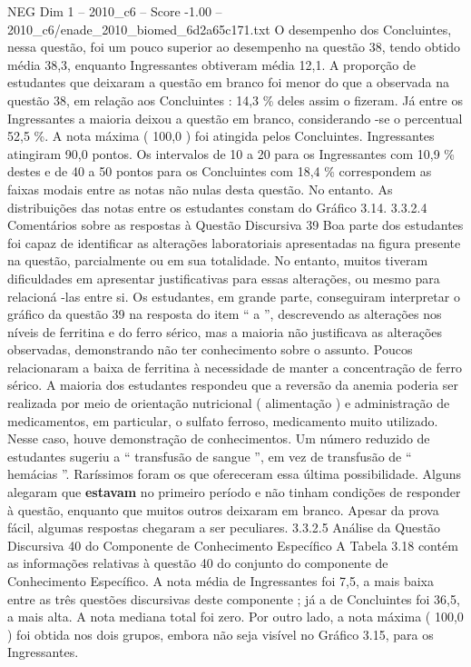 \begin{textsample}{NEG Dim 1 – 2010\_c6 – Score -1.00 – 2010\_c6/enade\_2010\_biomed\_6d2a65c171.txt}
O desempenho dos Concluintes, nessa questão, foi um pouco superior ao desempenho na questão 38, tendo obtido média 38,3, enquanto Ingressantes obtiveram média 12,1.
A proporção de estudantes que deixaram a questão em branco foi menor do que a observada na questão 38, em relação aos Concluintes : 14,3 \% deles assim o fizeram.
Já entre os Ingressantes a maioria deixou a questão em branco, considerando -se o percentual 52,5 \%.
A nota máxima ( 100,0 ) foi atingida pelos Concluintes.
Ingressantes atingiram 90,0 pontos.
Os intervalos de 10 a 20 para os Ingressantes com 10,9 \% destes e de 40 a 50 pontos para os Concluintes com 18,4 \% correspondem as faixas modais entre as notas não nulas desta questão.
No entanto.
As distribuições das notas entre os estudantes constam do Gráfico 3.14. 3.3.2.4 Comentários sobre as respostas à Questão Discursiva 39 Boa parte dos estudantes foi capaz de identificar as alterações laboratoriais apresentadas na figura presente na questão, parcialmente ou em sua totalidade.
No entanto, muitos tiveram dificuldades em apresentar justificativas para essas alterações, ou mesmo para relacioná -las entre si.
Os estudantes, em grande parte, conseguiram interpretar o gráfico da questão 39 na resposta do item “ a ”, descrevendo as alterações nos níveis de ferritina e do ferro sérico, mas a maioria não justificava as alterações observadas, demonstrando não ter conhecimento sobre o assunto.
Poucos relacionaram a baixa de ferritina à necessidade de manter a concentração de ferro sérico.
A maioria dos estudantes respondeu que a reversão da anemia poderia ser realizada por meio de orientação nutricional ( alimentação ) e administração de medicamentos, em particular, o sulfato ferroso, medicamento muito utilizado.
Nesse caso, houve demonstração de conhecimentos.
Um número reduzido de estudantes sugeriu a “ transfusão de sangue ”, em vez de transfusão de “ hemácias ”.
Raríssimos foram os que ofereceram essa última possibilidade.
Alguns alegaram que \textbf{estavam} no primeiro período e não tinham condições de responder à questão, enquanto que muitos outros deixaram em branco.
Apesar da prova fácil, algumas respostas chegaram a ser peculiares. 3.3.2.5 Análise da Questão Discursiva 40 do Componente de Conhecimento Específico A Tabela 3.18 contém as informações relativas à questão 40 do conjunto do componente de Conhecimento Específico.
A nota média de Ingressantes foi 7,5, a mais baixa entre as três questões discursivas deste componente ; já a de Concluintes foi 36,5, a mais alta.
A nota mediana total foi zero.
Por outro lado, a nota máxima ( 100,0 ) foi obtida nos dois grupos, embora não seja visível no Gráfico 3.15, para os Ingressantes.

\end{textsample}
